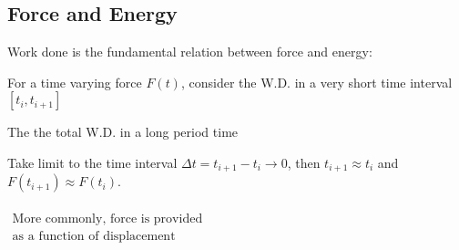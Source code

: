 \documentclass[class=article, crop=false, 12pt]{standalone}
\begin{document}
\subsection{Force and Energy}

Work done is the fundamental relation between force and energy:

For a time varying force $F(t)$, consider the W.D. in a very short time interval $[t_i, t_{i+1}]$

The the total W.D. in a long period time 

Take limit to the time interval $\Delta t = t_{i+1}-t_i \to 0$, then $t_{i+1}\approx t_i$ and $F(t_{i+1})\approx F(t_i)$.
\\\\
{$\substack{\displaystyle\text{More commonly, force is provided} \\ \displaystyle\text{as a function of displacement}}$}
\end{document}
